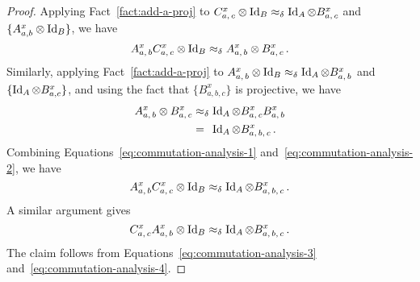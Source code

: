 \begin{proof}
  Applying Fact~\ref{fact:add-a-proj} to $C^x_{a,\, c} \otimes \mathop{\rm Id}\nolimits_B
  \approx_\delta \mathop{\rm Id}\nolimits_A \otimes B^x_{a,\, c}$ and $\{A^x_{a,b} \otimes
  \mathop{\rm Id}\nolimits_B \}$, we have
  \begin{equation}
    \label{eq:commutation-analysis-1}
    A^x_{a,\, b} C^x_{a,\, c} \otimes \mathop{\rm Id}\nolimits_B
    \approx_\delta A^x_{a,\, b} \otimes B^x_{a,\, c}\,.
  \end{equation}
  Similarly, applying Fact~\ref{fact:add-a-proj} to $A^x_{a,\, b} \otimes
  \mathop{\rm Id}\nolimits_B \approx_\delta \mathop{\rm Id}\nolimits_A \otimes B^x_{a,\, b}$ and $\{\mathop{\rm Id}\nolimits_A
  \otimes B^x_{a,c}\}$, and using the fact that $\{B^x_{a,b,c}\}$ is projective,
  we have
  \begin{equation}
    \label{eq:commutation-analysis-2}
    \begin{split}
      A^x_{a,\, b} \otimes B^x_{a,\, c}
      & \approx_\delta \mathop{\rm Id}\nolimits_A \otimes B^x_{a,\, c} B^x_{a,\, b}\\
      & =_{\phantom{\delta}} \mathop{\rm Id}\nolimits_A \otimes B^x_{a,\, b,\, c}\,.
    \end{split}
  \end{equation}
  Combining Equations~\eqref{eq:commutation-analysis-1}
  and~\eqref{eq:commutation-analysis-2}, we have
  \begin{equation}
    \label{eq:commutation-analysis-3}
    A^x_{a,\, b} C^x_{a,\, c} \otimes \mathop{\rm Id}\nolimits_B \approx_\delta
    \mathop{\rm Id}\nolimits_A \otimes B^x_{a,\, b,\, c}\,.
  \end{equation}
  A similar argument gives
  \begin{equation}
    \label{eq:commutation-analysis-4}
    C^x_{a,\, c} A^x_{a,\, b} \otimes \mathop{\rm Id}\nolimits_B \approx_\delta
    \mathop{\rm Id}\nolimits_A \otimes B^x_{a,\, b,\, c}\,.
  \end{equation}
  The claim follows from Equations~\eqref{eq:commutation-analysis-3}
  and~\eqref{eq:commutation-analysis-4}.
\end{proof}

